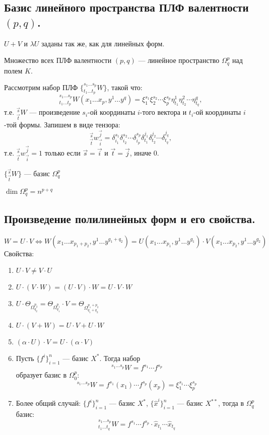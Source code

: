 \subsection{Базис линейного пространства ПЛФ валентности $(p,q)$.}
\begin{definition}
    $U+V$ и $\lambda U$ заданы так же, как для линейных форм.
\end{definition}
\begin{theorem}
    Множество всех ПЛФ валентности $(p, q)$ --- линейное пространство $\Omega^p_q$ над полем $K$.
\end{theorem}
Рассмотрим набор ПЛФ $\{{}^{s_1\ldots s_p}_{t_1\ldots t_p}W\}$, такой что:
$${}^{s_1\ldots s_p}_{t_1\ldots t_p}W(x_1\ldots x_p,y^1\ldots y^q)=\xi_1^{s_1}\xi_2^{s_2}\cdots \xi_p^{s_p}\eta^1_{t_1}\eta^2_{t_2}\cdots \eta^q_{t_q},$$
т.е. ${}^{\vec s}_{\vec t} W$ --- произведение $s_i$-ой координаты $i$-того вектора и $t_i$-ой координаты $i$-той формы. Запишем в виде тензора:
$${}^{\vec s}_{\vec t} w^{\vec j}_{\vec i}=\delta_{i_1}^{s_1}\delta_{i_2}^{s_2}\cdots \delta_{i_p}^{s_p}\delta_{t_1}^{j_1}\delta_{t_2}^{j_2}\cdots\delta_{t_q}^{j_q},$$
т.е. ${}^{\vec s}_{\vec t} w^{\vec j}_{\vec i}=1$ только если $\vec s=\vec i$ и $\vec t=\vec j$, иначе $0$.
\begin{theorem}
    $\{{}^{\vec s}_{\vec t} W\}$ --- базис $\Omega^p_q$
\end{theorem}
$\dim\Omega^p_q=n^{p+q}$
\subsection{Произведение полилинейных форм и его свойства.}
$$W=U\cdot V\Leftrightarrow W(x_1\ldots x_{p_1+p_2}, y^1\ldots y^{q_1+q_2})=U(x_1\ldots x_{p_1}, y^1\ldots y^{q_1})\cdot V(x_1\ldots x_{p_2}, y^1\ldots y^{q_2})$$
Свойства:
\begin{enumerate}
    \item $U\cdot V\not=V\cdot U$
    \item $U\cdot(V\cdot W)=(U\cdot V)\cdot W=U\cdot V\cdot W$
    \item $U\cdot \Theta_{\Omega^{p_2}_{q_2}}=\Theta_{\Omega^{p_1}_{q_1}}\cdot V=\Theta_{\Omega^{p_1+p_2}_{q_1+q_2}}$
    \item $U\cdot(V+W)=U\cdot V+U\cdot W$
    \item $(\alpha\cdot U)\cdot V=U\cdot (\alpha\cdot V)$
    \item Пусть $\{f^i\}_{i=1}^n$ --- базис $X^*$. Тогда набор
          $${}^{s_1\ldots s_p}W=f^{s_1}\cdots f^{s_p}$$
          образует базис в $\Omega^p_0$:
          $${}^{s_1\ldots s_p}W=f^{s_1}(x_1)\cdots f^{s_p}(x_p)=\xi^{s_1}_1\cdots \xi^{s_p}_p$$
    \item Более общий случай: $\{f^i\}_{i=1}^n$ --- базис $X^*$, $\{\hat x^i\}_{i=1}^n$ --- базис $X^{**}$, тогда в $\Omega^p_q$ базис:
          $${}^{s_1\ldots s_p}_{t_1\ldots t_q}W=f^{s_1}\cdots f^{s_p}\cdot \hat x_{t_1}\cdots \hat x_{t_q}$$
\end{enumerate}
